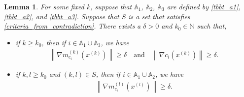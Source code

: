\documentclass{article}
\newtheorem{lemma}[theorem]{Lemma}
\theoremstyle{case}
\numberwithin{theorem}{subsection}
\newcommand{\gmcik}{{\nabla m_{c_i}^{(k)}\left(\xk\right)}}
\newcommand{\gmcil}{{\nabla m_{c_i}^{(l)}\left(\xl\right)}}
\newcommand{\naturals}{\mathbb N}
\newcommand{\xk}{x^{(k)}}
\newcommand{\xl}{{x^{(l)}}}
\begin{document}
\begin{lemma}
For some fixed $k$, suppose that $\mathbb A_1$, $\mathbb A_2$, $\mathbb A_3$
are defined by
\cref{tbbt_a1}, \cref{tbbt_a2}, and \cref{tbbt_a3}.
Suppose that $S$ is a set that satisfies \cref{criteria_from_contradiction}.
There exists a $\delta > 0$ and $k_0 \in \naturals$ such that,
\begin{itemize}
\item if $k \ge k_0$, then if $i \in \mathbb A_1 \cup \mathbb A_3$, we have
\begin{align*}
\left\|\gmcik\right\| \ge \delta \quad \textrm{and} \quad
\left\|\nabla c_i\left(\xk\right) \right\| \ge \delta.
\end{align*}
\item if $k, l \ge k_0$ and $(k, l) \in S$, then if $i \in \mathbb A_1 \cup \mathbb A_2$, we have
\begin{align*}
\left\|\gmcil\right\| \ge \delta.
\end{align*}
\end{itemize}
\end{lemma}
\end{document}
